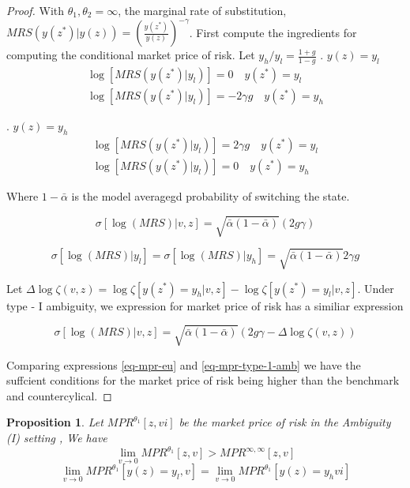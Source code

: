 \documentclass[12pt]{article}
\newtheorem{proposition}{Proposition}
\begin{document}
\begin{proof}
With $\theta_1,\theta_2=\infty$, the marginal rate of substitution, $MRS(y(z^*)|y(z)) = \left(\frac{y(z^*)}{y(z)}\right)^{-\gamma}$. First compute the ingredients for computing the conditional market price of risk. Let $y_h/y_l=\frac{1+g}{1-g}$
. $y(z)=y_l$
\begin{align}
\log[MRS(y(z^*)| y_l)]=0 \quad y(z^*)=y_l \\
\log[MRS(y(z^*)| y_l)]=-2\gamma g \quad y(z^*)=y_h 
\end{align}

. $y(z)=y_h$
\begin{align}
\log[MRS(y(z^*)| y_l)]= 2\gamma g\quad y(z^*)=y_l \\
\log[MRS(y(z^*)| y_l)]=0 \quad y(z^*)=y_h 
\end{align}

Where $1-\bar{\alpha}$ is the model averagegd  probability of switching the state. 

\begin{equation}
\label{eq-mpr-eu}
\sigma[\log(MRS)| v,z]= \sqrt{\bar{\alpha} (1-\bar{\alpha})} (2g\gamma)
\end{equation}


\[\sigma[\log(MRS)| y_l]= \sigma[\log(MRS)| y_h]=\sqrt{\bar{\alpha} (1-\bar{\alpha})}2\gamma g \]

Let $\Delta \log \zeta(v,z)= \log \zeta[y(z^*)=y_h|v,z]- \log \zeta[y(z^*)=y_l|v,z]$. Under type - I ambiguity, we expression for market price of risk has a similiar expression

\begin{equation}
\label{eq-mpr-type-1-amb}
\sigma[\log(MRS)| v,z]= \sqrt{\bar{\alpha} (1-\bar{\alpha})} (2g\gamma -\Delta \log \zeta(v,z) )
\end{equation}

Comparing expressions \ref{eq-mpr-eu} and  \ref{eq-mpr-type-1-amb} we have the suffcient conditions for the market price of risk being higher than the benchmark and countercylical.

\end{proof}


\begin{proposition}
\label{propo-mpr}
Let $MPR^{\theta_1}[z,vi]$ be the market price of risk in the Ambiguity (I) setting , We have 
\[\lim_{v\to0} MPR^{\theta_1}[z,v] >MPR^{\infty,\infty}[z,v] \]
\[\lim_{v\to0} MPR^{\theta_1}[y(z)=y_l,v] = \lim_{v\to0} MPR^{\theta_1}[y(z)=y_hvi] \]
\end{proposition}
\end{document}
